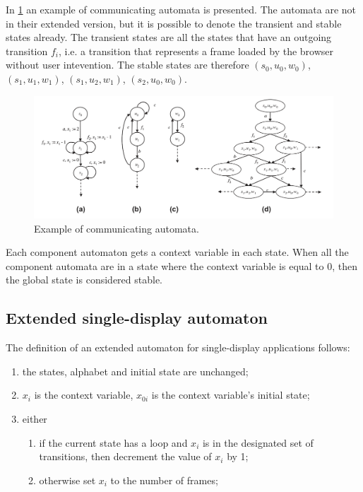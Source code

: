 \documentclass[a4paper,10pt]{article}
\theoremstyle{plain} %
\theoremstyle{definition}
\theoremstyle{remark}
\begin{document}
In \cref{fig:example-communicating-automata} an example of communicating automata is presented. The automata are not in their extended version, but it is possible to denote the transient and stable states already. The transient states are all the states that have an outgoing transition $f_i$, i.e. a transition that represents a frame loaded by the browser without user intevention. The stable states are therefore $(s_0,u_0,w_0)$, $(s_1,u_1,w_1)$, $(s_1,u_2,w_1)$, $(s_2,u_0,w_0)$.

\begin{figure}[h]
  \includegraphics[width=\textwidth]{img/communicating_automata_example.png}
  \caption{Example of communicating automata.}
  \label{fig:example-communicating-automata}
\end{figure}

Each component automaton gets a context variable in each state. When all the component automata are in a state where the context variable is equal to 0, then the global state is considered stable.

\subsection{Extended single-display automaton}

The definition of an extended automaton for single-display applications follows:

\begin{enumerate}
  \item the states, alphabet and initial state are unchanged;
  \item $x_i$ is the context variable, $x_{0i}$ is the context variable's initial state;
  \item either
    \begin{enumerate}
      \item if the current state has a loop and $x_i$ is in the designated set of transitions, then decrement the value of $x_i$ by 1;
      \item otherwise set $x_i$ to the number of frames;
    \end{enumerate}
\end{enumerate}
\end{document}
